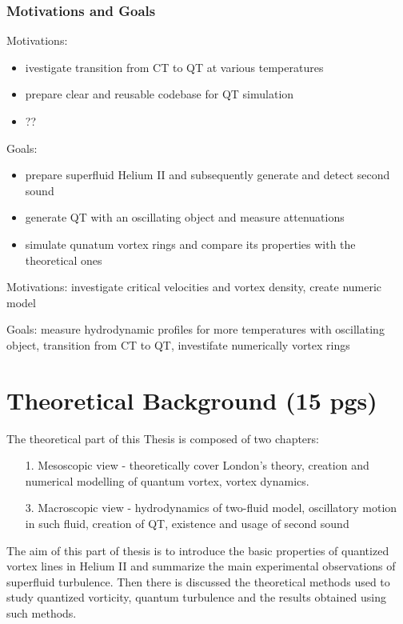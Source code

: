 	\subsection*{Motivations and Goals}

	Motivations:
	\begin{itemize}
		\item ivestigate transition from CT to QT at various temperatures
		\item prepare clear and reusable codebase for QT simulation
		\item ??
	\end{itemize}

	Goals:
	\begin{itemize}
		\item prepare superfluid Helium II and subsequently generate and detect second sound
		\item generate QT with an oscillating object and measure attenuations
		\item simulate qunatum vortex rings and compare its properties with the theoretical ones
	\end{itemize}

	Motivations: investigate critical velocities and vortex density, create numeric model

	Goals: measure hydrodynamic profiles for more temperatures with oscillating object, transition from CT to QT, investifate numerically vortex rings

\newpage
\chapter{Theoretical Background (15 pgs)}

The theoretical part of this Thesis is composed of two chapters:

\begin{itemize}
	\item[1.] Mesoscopic view - theoretically cover London's theory, creation and numerical modelling of quantum vortex, vortex dynamics.

	\item[3.] Macroscopic view - hydrodynamics of two-fluid model, oscillatory motion in such fluid, creation of QT, existence and usage of second sound

\end{itemize}

The aim of this part of thesis is to introduce the basic properties of quantized vortex lines in Helium II and summarize the main experimental observations of superfluid turbulence. Then there is discussed the theoretical methods used to study quantized vorticity, quantum turbulence and the results obtained using such methods.



